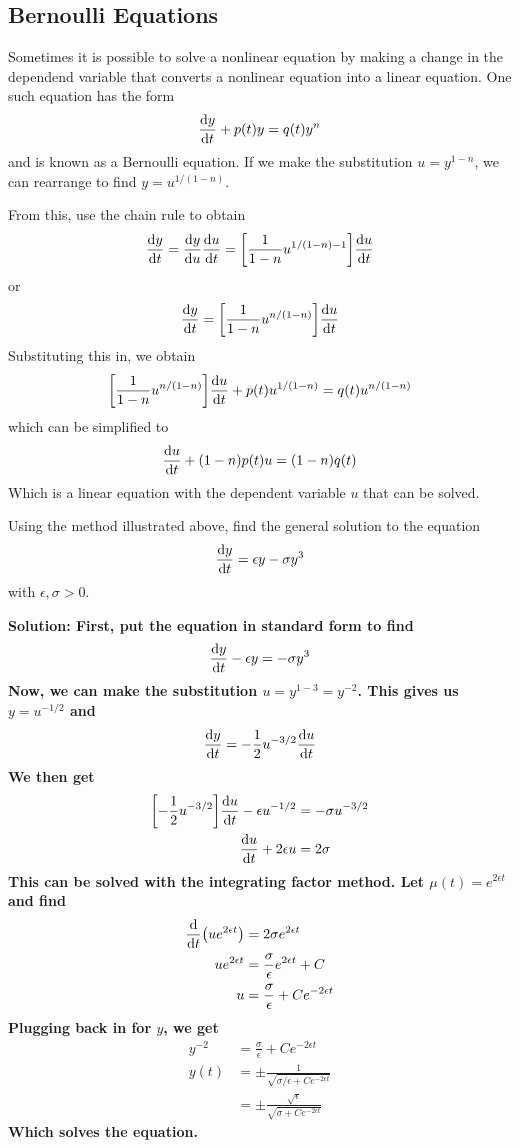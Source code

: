\subsection{Bernoulli Equations}
Sometimes it is possible to solve a nonlinear equation by making a change in the dependend variable that converts a nonlinear equation into a linear equation. One such equation has the form
\[ \dv{y}{t} + p(t)y = q(t)y^n \]
and is known as a Bernoulli equation. If we make the substitution $u = y^{1-n}$, we can rearrange to find $y = u^{1/(1-n)}$. \par
From this, use the chain rule to obtain
\[ \dv{y}{t} = \dv{y}{u}\dv{u}{t} = \bqty{\frac{1}{1-n}u^{1/(1-n)-1}}\dv{u}{t} \]
or
\[ \dv{y}{t} = \bqty{\frac{1}{1-n}u^{n/(1-n)}}\dv{u}{t} \] 
Substituting this in, we obtain
\[ \bqty{\frac{1}{1-n}u^{n/(1-n)}}\dv{u}{t} + p(t)u^{1/(1-n)} = q(t)u^{n/(1-n)}\]
which can be simplified to
\[ \dv{u}{t} + (1-n)p(t)u = (1-n)q(t)\]
Which is a linear equation with the dependent variable $u$ that can be solved.
\begin{example}
    Using the method illustrated above, find the general solution to the equation
    \[ \dv{y}{t} = \epsilon y - \sigma y^3\]
    with $\epsilon, \sigma >0$. \par
    \bf{Solution:} First, put the equation in standard form to find
    \[ \dv{y}{t} - \epsilon y = -\sigma y^3 \]
    Now, we can make the substitution $u = y^{1-3} = y^{-2}$. This gives us $y = u^{-1/2}$ and
    \[ \dv{y}{t} = -\frac{1}{2}u^{-3/2} \dv{u}{t} \]
    We then get
    \begin{align*}
        \bqty{-\frac{1}{2}u^{-3/2}} \dv{u}{t} - \epsilon u^{-1/2} &= -\sigma u^{-3/2} \\
        \dv{u}{t} + 2\epsilon u &= 2\sigma
    \end{align*}
    This can be solved with the integrating factor method. Let $\mu(t) = e^{2\epsilon t}$ and find
    \begin{align*}
        \dv{t} \pqty{ue^{2\epsilon t}} &= 2\sigma e^{2\epsilon t} \\
        ue^{2\epsilon t} &= \frac{\sigma}{\epsilon} e^{2\epsilon t} + C \\
        u &= \frac{\sigma}{\epsilon} + Ce^{-2\epsilon t}
    \end{align*}
    Plugging back in for $y$, we get
    \begin{align*}
        y^{-2} &= \frac{\sigma}{\epsilon} + Ce^{-2\epsilon t} \\
        y(t) &= \pm \frac{1}{\sqrt{\sigma/\epsilon + Ce^{-2\epsilon t}}} \\
        &= \pm\frac{\sqrt{\epsilon}}{\sqrt{\sigma + Ce^{-2\epsilon t}}}
    \end{align*}
    Which solves the equation.
\end{example}
